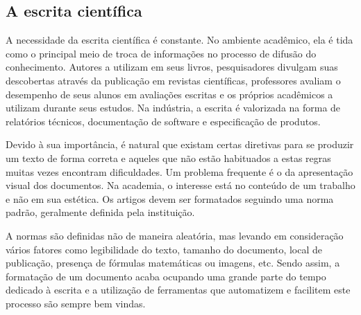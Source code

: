 \subsection{A escrita científica}
A necessidade da escrita científica é constante. No ambiente acadêmico, ela é tida como o principal meio de troca de informações %
no processo de difusão do conhecimento. Autores a utilizam em seus livros, pesquisadores divulgam suas descobertas através da publicação em revistas científicas, professores avaliam o desempenho de seus alunos em avaliações escritas e os próprios acadêmicos a utilizam durante seus estudos. Na indústria, a escrita é valorizada na forma de relatórios técnicos, documentação de software e especificação de produtos.

Devido à sua importância, é natural que existam certas diretivas para se produzir um texto de forma correta e aqueles que não estão habituados a estas regras muitas vezes encontram dificuldades. Um problema frequente é o da apresentação visual dos documentos. Na academia, o interesse está no conteúdo de um trabalho e não em sua estética. Os artigos devem ser formatados seguindo uma norma padrão, geralmente definida pela instituição. 

A normas são definidas não de maneira aleatória, mas levando em consideração vários fatores como legibilidade do texto, tamanho do documento, local de publicação, presença de fórmulas matemáticas ou imagens, etc. Sendo assim, a formatação de um documento acaba ocupando uma grande parte do tempo dedicado à escrita e a utilização de ferramentas que automatizem e facilitem este processo são sempre bem vindas.

